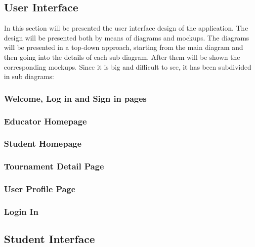 \subsection{User Interface}
In this section will be presented the user interface design of the application. The design will be presented both by means of diagrams and mockups. The diagrams will be presented in a top-down approach, starting from the main diagram and then going into the details of each sub diagram. After them will be shown the corresponding mockups.
Since it is big and difficult to see, it has been subdivided in sub diagrams:
\clearpage
\subsubsection{Welcome, Log in and Sign in pages}
\clearpage
\subsubsection{Educator Homepage}
\clearpage
\subsubsection{Student Homepage}
\clearpage
\subsubsection{Tournament Detail Page}
\clearpage
\subsubsection{User Profile Page}
\subsubsection{Login In}



\subsection{Student Interface}
